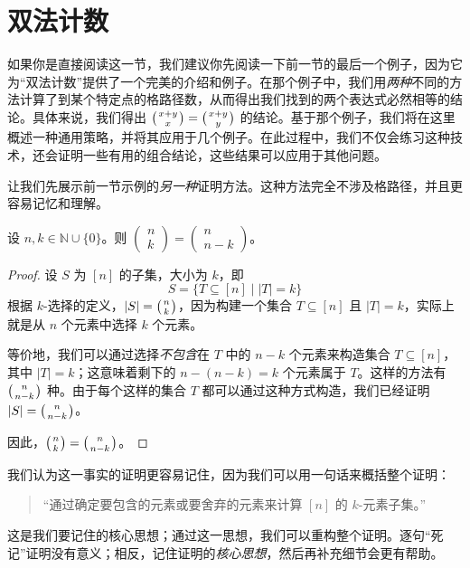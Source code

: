 \section{双法计数}\label{sec:section8.4}

如果你是直接阅读这一节，我们建议你先阅读一下前一节的最后一个例子，因为它为``双法计数''提供了一个完美的介绍和例子。在那个例子中，我们用\emph{两种}不同的方法计算了到某个特定点的格路径数，从而得出我们找到的两个表达式必然相等的结论。具体来说，我们得出 $\big({x+y \atop x}\big)=\big({x+y \atop y}\big)$ 的结论。基于那个例子，我们将在这里概述一种通用策略，并将其应用于几个例子。在此过程中，我们不仅会练习这种技术，还会证明一些有用的组合结论，这些结果可以应用于其他问题。

让我们先展示前一节示例的\emph{另一种}证明方法。这种方法完全不涉及格路径，并且更容易记忆和理解。

\begin{proposition}
    设 $n,k \in \mathbb{N} \cup \{0\}$。则 $\begin{pmatrix}n\\k\end{pmatrix} = \begin{pmatrix}n\\n-k\end{pmatrix}$。
\end{proposition}

\begin{proof}
    设 $S$ 为 $[n]$ 的子集，大小为 $k$，即
    \[S = \{T \subseteq [n] \mid |T| = k\}\]
    根据 $k$-选择的定义，$|S|=\big({n \atop k}\big)$，因为构建一个集合 $T \subseteq [n]$ 且 $|T| = k$，实际上就是从 $n$ 个元素中选择 $k$ 个元素。

    等价地，我们可以通过选择\emph{不包含}在 $T$ 中的 $n - k$ 个元素来构造集合 $T \subseteq [n]$，其中 $|T| = k$；这意味着剩下的 $n - (n - k) = k$ 个元素属于 $T$。这样的方法有 $\big({n \atop n-k}\big)$ 种。由于每个这样的集合 $T$ 都可以通过这种方式构造，我们已经证明 $|S| = \big({n \atop n-k}\big)$。

    因此，$\big({n \atop k}\big) = \big({n \atop n-k}\big)$。
\end{proof}

我们认为这一事实的证明更容易记住，因为我们可以用一句话来概括整个证明：

\begin{quotation}
    ``通过确定要包含的元素或要舍弃的元素来计算 $[n]$ 的 $k$-元素子集。''
\end{quotation}

这是我们要记住的核心思想；通过这一思想，我们可以重构整个证明。逐句``死记''证明没有意义；相反，记住证明的\emph{核心思想}，然后再补充细节会更有帮助。











